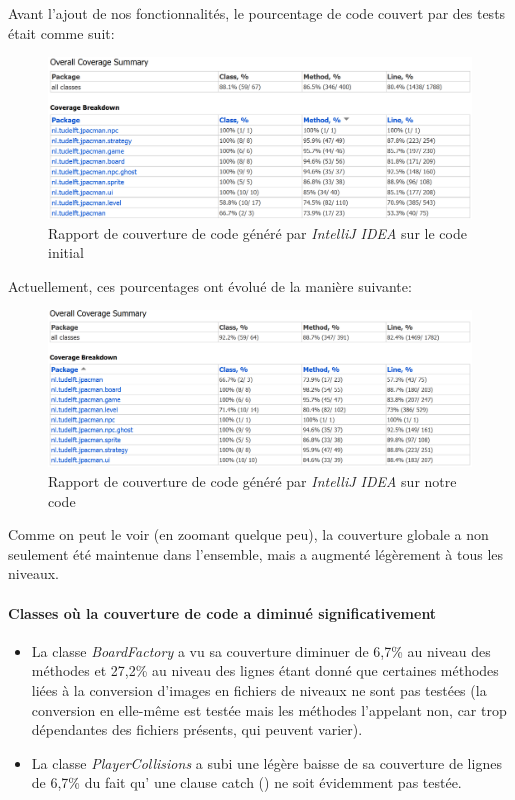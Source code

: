 \documentclass[12pt, openany]{report}
\begin{document}
Avant l'ajout de nos fonctionnalités, le pourcentage de code couvert par des tests était comme suit: 

\begin{figure}[h]
	\centering
	\includegraphics[width=\textwidth]{Images/InitialCoverage}
	\caption{\label{InitialCoverage} Rapport de couverture de code généré par \textit{IntelliJ IDEA} sur le code initial}
\end{figure}


Actuellement, ces pourcentages ont évolué de la manière suivante:

\begin{figure}[h]
	\centering
	\includegraphics[width=\textwidth]{Images/MergedCoverage}
	\caption{\label{MergedCoverage} Rapport de couverture de code généré par \textit{IntelliJ IDEA} sur notre code}
\end{figure}

Comme on peut le voir (en zoomant quelque peu), la couverture globale a non seulement été maintenue dans l'ensemble, mais a augmenté légèrement à tous les niveaux.

\paragraph{Classes où la couverture de code a diminué significativement}

\begin{itemize}
	\item La classe \mbox{\textit{BoardFactory}} a vu sa couverture diminuer de 6,7\% au niveau des méthodes et 27,2\% au niveau des lignes étant donné que certaines méthodes liées à la conversion d'images en fichiers de niveaux ne sont pas testées (la conversion en elle-même est testée mais les méthodes l'appelant non, car trop dépendantes des fichiers présents, qui peuvent varier).
	\item La classe \mbox{\textit{PlayerCollisions}} a subi une légère baisse de sa couverture de lignes de 6,7\% du fait qu' une clause \og catch \fg() ne soit évidemment pas testée.
\end{itemize}
\end{document}
